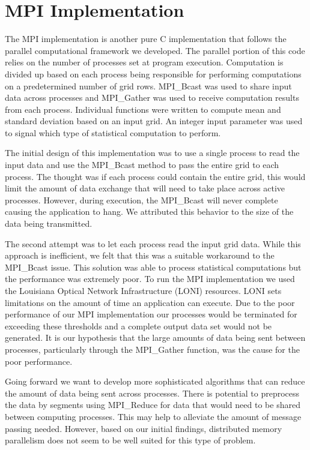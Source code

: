 \section{MPI Implementation}
The MPI implementation is another pure C implementation that follows the parallel computational framework we developed. 
The parallel portion of this code relies on the number of processes set at program execution. 
Computation is divided up based on each process being responsible for performing computations on a predetermined number of grid rows. 
MPI\_Bcast was used to share input data across processes and MPI\_Gather was used to receive computation results from each process. 
Individual functions were written to compute mean and standard deviation based on an input grid. 
An integer input parameter was used to signal which type of statistical computation to perform.

\par
The initial design of this implementation was to use a single process to read the input data and use the MPI\_Bcast method to pass the entire grid to each process. 
The thought was if each process could contain the entire grid, this would limit the amount of data exchange that will need to take place across active processes. 
However, during execution, the MPI\_Bcast will never complete causing the application to hang. 
We attributed this behavior to the size of the data being transmitted.

\par
The second attempt was to let each process read the input grid data. 
While this approach is inefficient, we felt that this was a suitable workaround to the MPI\_Bcast issue. 
This solution was able to process statistical computations but the performance was extremely poor. 
To run the MPI implementation we used the Louisiana Optical Network Infrastructure (LONI) resources. 
LONI sets limitations on the amount of time an application can execute. 
Due to the poor performance of our MPI implementation our processes would be terminated for exceeding these thresholds and a complete output data set would not be generated. 
It is our hypothesis that the large amounts of data being sent between processes, particularly through the MPI\_Gather function, was the cause for the poor performance.

\par
Going forward we want to develop more sophisticated algorithms that can reduce the amount of data being sent across processes. 
There is potential to preprocess the data by segments using MPI\_Reduce for data that would need to be shared between computing processes. 
This may help to alleviate the amount of message passing needed. 
However, based on our initial findings, distributed memory parallelism does not seem to be well suited for this type of problem.